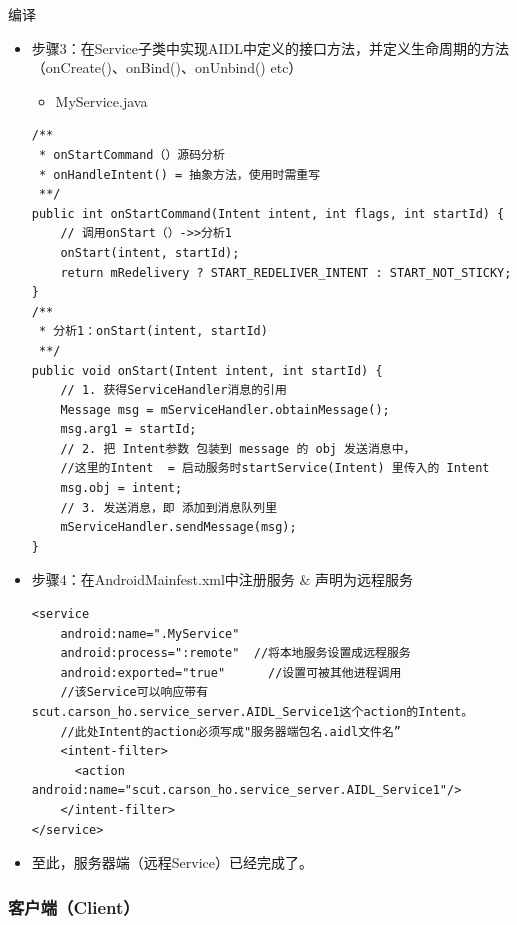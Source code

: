 \documentclass[9pt, b5paper]{article}
\begin{document}
编译
\begin{itemize}
\item 步骤3：在Service子类中实现AIDL中定义的接口方法，并定义生命周期的方法（onCreate()、onBind()、onUnbind() etc）
\begin{itemize}
\item MyService.java
\end{itemize}
\begin{verbatim}
/** 
 * onStartCommand（）源码分析
 * onHandleIntent() = 抽象方法，使用时需重写
 **/ 
public int onStartCommand(Intent intent, int flags, int startId) {
    // 调用onStart（）->>分析1
    onStart(intent, startId);
    return mRedelivery ? START_REDELIVER_INTENT : START_NOT_STICKY;
}
/** 
 * 分析1：onStart(intent, startId)
 **/ 
public void onStart(Intent intent, int startId) {
    // 1. 获得ServiceHandler消息的引用
    Message msg = mServiceHandler.obtainMessage();
    msg.arg1 = startId;
    // 2. 把 Intent参数 包装到 message 的 obj 发送消息中，
    //这里的Intent  = 启动服务时startService(Intent) 里传入的 Intent
    msg.obj = intent;
    // 3. 发送消息，即 添加到消息队列里
    mServiceHandler.sendMessage(msg);
}
\end{verbatim}
\item 步骤4：在AndroidMainfest.xml中注册服务 \& 声明为远程服务
\begin{verbatim}
<service
    android:name=".MyService"
    android:process=":remote"  //将本地服务设置成远程服务
    android:exported="true"      //设置可被其他进程调用
    //该Service可以响应带有scut.carson_ho.service_server.AIDL_Service1这个action的Intent。
    //此处Intent的action必须写成"服务器端包名.aidl文件名”
    <intent-filter>
      <action android:name="scut.carson_ho.service_server.AIDL_Service1"/>
    </intent-filter>
</service>
\end{verbatim}
\item 至此，服务器端（远程Service）已经完成了。
\end{itemize}
\subsubsection{客户端（Client）}
\label{sec-5-6-2}
\end{document}

